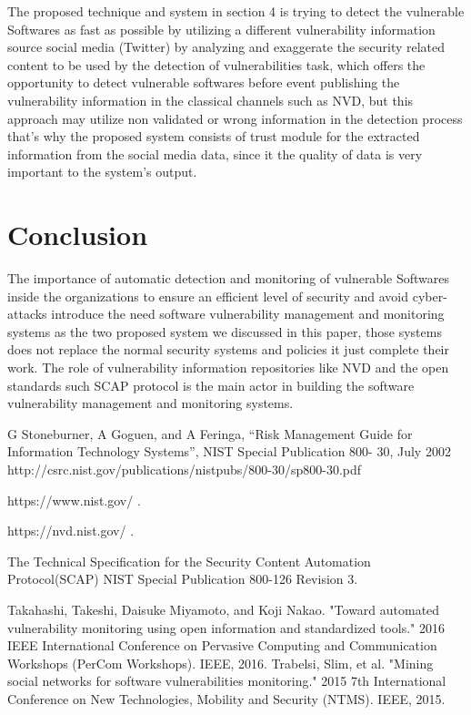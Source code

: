 \documentclass{llncs}
\begin{document}
\par The proposed technique and system in section 4 is trying to detect the vulnerable Softwares as fast as possible by utilizing a different vulnerability information source social media (Twitter) by analyzing and exaggerate the security related content to be used by the detection of vulnerabilities task, which offers the opportunity to detect vulnerable softwares before event publishing the vulnerability information in the classical channels such as NVD, but this approach may utilize non validated or wrong information in the detection process that's why the proposed system consists of trust module for the extracted information from the social media data, since it the quality of data is very important to the system's output. 
      
\section{Conclusion}

\par The importance of automatic detection and monitoring of vulnerable Softwares inside the organizations to ensure an efficient level of security and avoid cyber-attacks introduce the need software vulnerability management and monitoring systems as the two proposed system we discussed in this paper,  those systems does not replace the normal security systems and policies it just complete their work. The role of vulnerability information repositories like NVD and the open standards such SCAP protocol is the main actor in building the software vulnerability management and monitoring systems.   


\newpage
\begin{thebibliography}{[MT1]}

%


G Stoneburner, A Goguen, and A Feringa, “Risk Management Guide
for Information Technology Systems”, NIST Special Publication 800-
30, July 2002
http://csrc.nist.gov/publications/nistpubs/800-30/sp800-30.pdf

https://www.nist.gov/ .

https://nvd.nist.gov/ .



The Technical Specification for the
Security Content Automation Protocol(SCAP)
NIST Special Publication 800-126
Revision 3.


Takahashi, Takeshi, Daisuke Miyamoto, and Koji Nakao. "Toward automated vulnerability monitoring using open information and standardized tools." 2016 IEEE International Conference on Pervasive Computing and Communication Workshops (PerCom Workshops). IEEE, 2016.
Trabelsi, Slim, et al. "Mining social networks for software vulnerabilities monitoring." 2015 7th International Conference on New Technologies, Mobility and Security (NTMS). IEEE, 2015.
%
\end{thebibliography}
\end{document}
